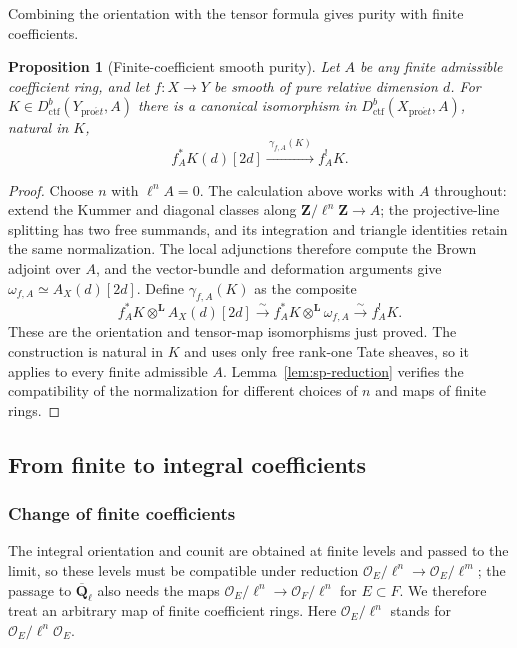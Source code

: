 \documentclass[11pt,a4paper]{article}
\numberwithin{equation}{section}
\newtheorem{proposition}[theorem]{Proposition}
\theoremstyle{definition}
\theoremstyle{remark}
\newcommand{\Qbar}{\overline{\mathbf Q}_\ell}
\newcommand{\proet}{\mathrm{pro}\acute{e}t}
\newcommand{\Dctf}{D^b_{\mathrm{ctf}}}
\begin{document}
Combining the orientation with the tensor formula gives purity with
finite coefficients.

\begin{proposition}[Finite-coefficient smooth purity]
\label{prop:sp-finite}
Let $A$ be any finite admissible coefficient ring, and let
$f:X\to Y$ be smooth of pure relative dimension $d$.
For $K\in\Dctf(Y_{\proet},A)$ there is a canonical
isomorphism in $\Dctf(X_{\proet},A)$, natural in $K$,
\begin{equation}\label{eq:sp-finite}
 f_A^{*}K(d)[2d]
   \xrightarrow{\ \gamma_{f,A}(K)\ }f_A^{!}K.
\end{equation}
\end{proposition}
\begin{proof}
Choose $n$ with $\ell^nA=0$. The calculation above works with $A$
throughout: extend the Kummer and diagonal classes along
$\mathbf Z/\ell^n\mathbf Z\to A$; the projective-line splitting has
two free summands, and its integration and triangle identities retain
the same normalization. The local adjunctions therefore compute the
Brown adjoint over $A$, and the vector-bundle and deformation
arguments give $\omega_{f,A}\simeq A_X(d)[2d]$. Define $\gamma_{f,A}(K)$
as the composite
\[
 f_A^{*}K\otimes^{\mathbf L}A_X(d)[2d]
   \xrightarrow{\sim}f_A^{*}K\otimes^{\mathbf L}\omega_{f,A}
   \xrightarrow{\sim}f_A^{!}K.
\]
These are the orientation and tensor-map isomorphisms just proved.
The construction is natural in $K$ and uses only free rank-one Tate
sheaves, so it applies to every finite admissible $A$.
Lemma~\ref{lem:sp-reduction} verifies the compatibility of the
normalization for different choices of $n$ and maps of finite rings.
\end{proof}

\subsection{From finite to integral coefficients}
\label{sp:grp-integral}

\subsubsection{Change of finite coefficients}

The integral orientation and counit are obtained at finite levels
and passed to the limit, so these levels must be compatible under reduction
$\mathcal O_E/\ell^n\to\mathcal O_E/\ell^m$; the passage to $\Qbar$ also
needs the maps $\mathcal O_E/\ell^n\to\mathcal O_F/\ell^n$ for
$E\subset F$. We therefore treat an arbitrary map of finite coefficient
rings. Here $\mathcal O_E/\ell^n$ stands for
$\mathcal O_E/\ell^n\mathcal O_E$.
\end{document}
